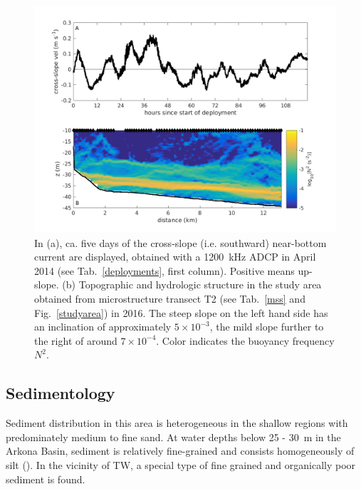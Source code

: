   \begin{figure}[ht]
\includegraphics[width=40pc]{bilder/abslope.png}
 \caption{In (a), ca. five days of the cross-slope (i.e. southward) near-bottom 
current are displayed, obtained with a 1200~kHz ADCP in April 2014 (see Tab.\ 
\ref{deployments}, first column). Positive means up-slope. (b) Topographic and 
hydrologic structure in the study area obtained from microstructure transect T2 
(see Tab.\ \ref{mss} and Fig.\ \ref{studyarea}) in 2016. The steep slope on the 
left hand side has an inclination of approximately $5 \times 10^{-3}$, the mild 
slope further to the right of around $7 \times 10^{-4}$. Color indicates the 
buoyancy frequency $N^2$.} \label{abslope}
 \end{figure}

 \FloatBarrier
\subsection{Sedimentology}\label{sedmol}

  Sediment distribution in this area is heterogeneous in the shallow regions 
with predominately medium to fine sand. At water depths below 25 - 30~m in the 
Arkona Basin, sediment is relatively fine-grained and consists homogeneously of 
silt (\fig{tauberkarte}). In the vicinity of TW, a special type of fine grained 
and organically poor sediment is found. 

